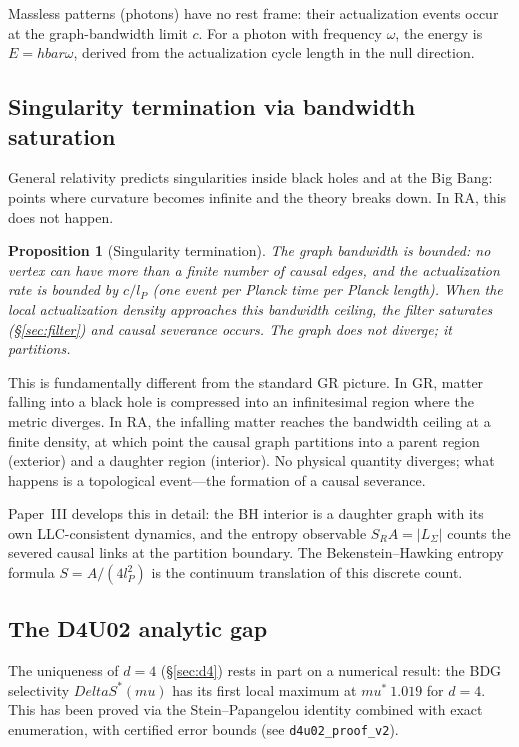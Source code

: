 \documentclass[11pt]{article}
\DeclareRobustCommand{\hbar}{\ensuremath{\hslash}}
\newcommand{\SRa}{S_{\mathrm{RA}}}
\def\hbar{hbar}%
\def\ell{l}%
\def\Delta{Delta}%
\def\mu{mu}%
\def\mathrm#1{#1}%
\def\approx{~}%
\def\SRa{S_RA}%
\newtheorem{proposition}{Proposition}
\begin{document}
Massless patterns (photons) have no rest frame: their actualization events occur at the graph-bandwidth limit $c$. For a photon with frequency $\omega$, the energy is $E = \hbar\omega$, derived from the actualization cycle length in the null direction.

\subsection{Singularity termination via bandwidth saturation}

General relativity predicts singularities inside black holes and at the Big Bang: points where curvature becomes infinite and the theory breaks down. In RA, this does not happen.

\begin{proposition}[Singularity termination]
\label{prop:singularity}
The graph bandwidth is bounded: no vertex can have more than a finite number of causal edges, and the actualization rate is bounded by $c/\ell_P$ (one event per Planck time per Planck length). When the local actualization density approaches this bandwidth ceiling, the filter saturates (\S\ref{sec:filter}) and causal severance occurs. The graph does not diverge; it partitions.
\end{proposition}

This is fundamentally different from the standard GR picture. In GR, matter falling into a black hole is compressed into an infinitesimal region where the metric diverges. In RA, the infalling matter reaches the bandwidth ceiling at a finite density, at which point the causal graph partitions into a parent region (exterior) and a daughter region (interior). No physical quantity diverges; what happens is a topological event---the formation of a causal severance.

Paper~III develops this in detail: the BH interior is a daughter graph with its own LLC-consistent dynamics, and the entropy observable $\SRa = |L_\Sigma|$ counts the severed causal links at the partition boundary. The Bekenstein--Hawking entropy formula $S = A/(4\ell_P^2)$ is the continuum translation of this discrete count.

\subsection{The D4U02 analytic gap}
\label{sec:d4u02_gap}

The uniqueness of $d=4$ (\S\ref{sec:d4}) rests in part on a numerical result: the BDG selectivity $\Delta S^*(\mu)$ has its first local maximum at $\mu^* \approx 1.019$ for $d=4$. This has been proved via the Stein--Papangelou identity combined with exact enumeration, with certified error bounds (see \texttt{d4u02\_proof\_v2}).
\end{document}
